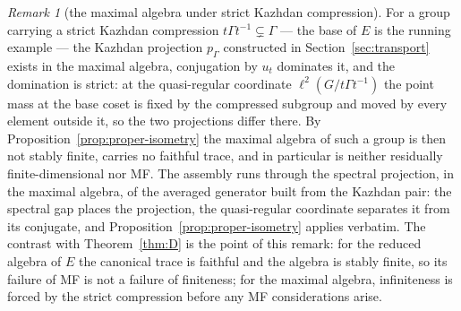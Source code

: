 \documentclass[11pt]{amsart}
\newcommand{\leanverified}[2]{\ignorespaces}
\theoremstyle{definition}
\theoremstyle{remark}
\newtheorem{remark}[theorem]{Remark}
\theoremstyle{plain}
\begin{document}
\begin{remark}[the maximal algebra under strict Kazhdan compression]
\label{rem:maxinfinite}
For a group carrying a strict Kazhdan compression
$t\Gamma t^{-1}\subsetneq\Gamma$ --- the base of $E$ is the running
example --- the Kazhdan projection $p_\Gamma$ constructed in
Section~\ref{sec:transport} exists in the maximal
algebra, conjugation by $u_t$ dominates it, and the domination is
strict: at the quasi-regular coordinate $\ell^2(G/t\Gamma t^{-1})$ the
point mass at the base coset is fixed by the compressed subgroup and
moved by every element outside it, so the two projections differ
there.
\leanverified{Analysis/QuasiRegularWitness}{GroupApproximation.QuasiRegularWitness.baseVector_apply_base}
By Proposition~\ref{prop:proper-isometry} the maximal algebra of such
a group is then not stably finite, carries no faithful trace, and in
particular is neither residually finite-dimensional nor MF\@.  The
assembly runs through the spectral projection, in the maximal algebra,
of the averaged generator built from the Kazhdan pair: the spectral
gap places the projection, the quasi-regular coordinate separates it
from its conjugate, and Proposition~\ref{prop:proper-isometry}
applies verbatim.  The contrast with Theorem~\ref{thm:D} is the point of
this remark: for the reduced algebra of $E$ the canonical trace is
faithful and the algebra is stably finite, so its failure of MF is not
a failure of finiteness; for the maximal algebra, infiniteness is
forced by the strict compression before any MF considerations arise.
\end{remark}
\end{document}
